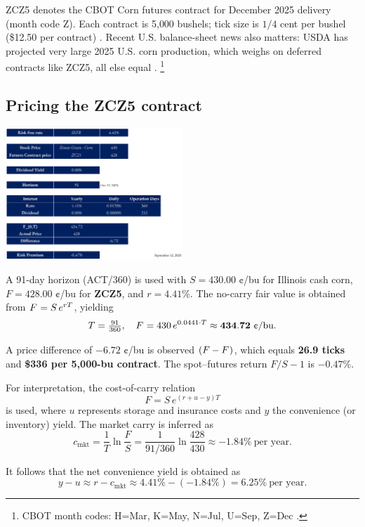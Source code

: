 \documentclass[10pt,a4paper]{article} %
\begin{document}
ZCZ5 denotes the CBOT Corn futures contract for December 2025 delivery (month code Z). Each contract is 5{,}000 bushels; tick size is $1/4$ cent per bushel (\$12.50 per contract) \citep{barchart_zc_specs}.
Recent U.S. balance-sheet news also matters: USDA has projected very large 2025 U.S. corn production, which weighs on deferred contracts like ZCZ5, all else equal \citep{reuters_record_crop_2025}.
\footnote{CBOT month codes: H=Mar, K=May, N=Jul, U=Sep, Z=Dec \citep{barchart_zc_specs}.}

\subsection{Pricing the ZCZ5 contract}
\begin{center}
\includegraphics[width=0.5\textwidth]{figures/corn2.png}
\end{center}

A 91-day horizon (ACT/360) is used with $S=430.00$ ¢/bu for Illinois cash corn, $F=428.00$ ¢/bu for \textbf{ZCZ5}, and $r=4.41\%$. The no-carry fair value is obtained from $F^{\*}=S\,e^{rT}$, yielding
\[
T=\tfrac{91}{360},\quad F^{\*}=430\,e^{0.0441\cdot T}\approx \mathbf{434.72}\ \text{¢/bu}.
\]

A price difference of $\mathbf{-6.72}$ ¢/bu is observed $(F-F^{\*})$, which equals \textbf{26.9 ticks} and \textbf{\$336 per 5,000-bu contract}. The spot–futures return $F/S-1$ is $\mathbf{-0.47\%}$.

For interpretation, the cost-of-carry relation
\[
F=S\,e^{(r+u-y)T}
\]
is used, where $u$ represents storage and insurance costs and $y$ the convenience (or inventory) yield. The market carry is inferred as
\[
c_{\text{mkt}}=\frac{1}{T}\ln\!\frac{F}{S}
=\frac{1}{91/360}\ln\!\frac{428}{430}\approx \mathbf{-1.84\%}\ \text{per year}.
\]

It follows that the net convenience yield is obtained as
\[
y-u \approx r-c_{\text{mkt}}\approx 4.41\%-(-1.84\%)=\mathbf{6.25\%}\ \text{per year}.
\]
\end{document}

